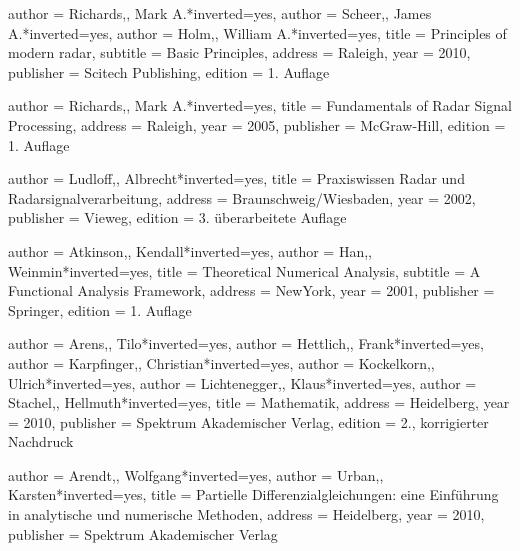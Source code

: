 
\begin{bibdiv}
\begin{biblist}

 {
    author = {{Richards,}, Mark A.}*{inverted={yes}},
    author = {{Scheer,}, James A.}*{inverted={yes}},
    author = {{Holm,}, William A.}*{inverted={yes}},
    title = {Principles of modern radar},
    subtitle = {Basic Principles},
    address = {Raleigh},
    year = {2010},
    publisher = {Scitech Publishing},
    edition = {1. Auflage}
}

 {
    author = {{Richards,}, Mark A.}*{inverted={yes}},
    title = {Fundamentals of Radar Signal Processing},
    address = {Raleigh},
    year = {2005},
    publisher = {McGraw-Hill},
    edition = {1. Auflage}
}

 {
    author = {{Ludloff,}, Albrecht}*{inverted={yes}},
    title = {Praxiswissen Radar und Radarsignalverarbeitung},
    address = {Braunschweig/Wiesbaden},
    year = {2002},
    publisher = {Vieweg},
    edition = {3. überarbeitete Auflage}
}

 {
    author = {{Atkinson,}, Kendall}*{inverted={yes}},
    author = {{Han,}, Weinmin}*{inverted={yes}},
    title = {Theoretical Numerical Analysis},
    subtitle = {A Functional Analysis Framework},
    address = {NewYork},
    year = {2001},
    publisher = {Springer},
    edition = {1. Auflage}
}

 {
    author = {{Arens,}, Tilo}*{inverted={yes}},
    author = {{Hettlich,}, Frank}*{inverted={yes}},
    author = {{Karpfinger,}, Christian}*{inverted={yes}},
    author = {{Kockelkorn,}, Ulrich}*{inverted={yes}},
    author = {{Lichtenegger,}, Klaus}*{inverted={yes}},
    author = {{Stachel,}, Hellmuth}*{inverted={yes}},
    title = {Mathematik},
    address = {Heidelberg},
    year = {2010},
    publisher = {Spektrum Akademischer Verlag},
    edition = {2., korrigierter Nachdruck}
}

 {
    author = {{Arendt,}, Wolfgang}*{inverted={yes}},
    author = {{Urban,}, Karsten}*{inverted={yes}},
    title = {Partielle Differenzialgleichungen: eine Einführung in analytische und numerische Methoden},
    address = {Heidelberg},
    year = {2010},
    publisher = {Spektrum Akademischer Verlag}
}



\end{biblist}
\end{bibdiv}
